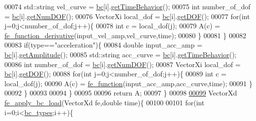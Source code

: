 \begin{DoxyCode}
00074             std::string vel\_curve = \hyperlink{_global_variables_8h_a20bdb84bef6e8184528b6f4394cf4f7a}{bc}[i].\hyperlink{class_b_c_a3590d0a29a9261d99f21ee75340e5722}{getTimeBehavior}();
00075             \textcolor{keywordtype}{int} number\_of\_dof = \hyperlink{_global_variables_8h_a20bdb84bef6e8184528b6f4394cf4f7a}{bc}[i].\hyperlink{class_b_c_a6e42c3db5c67435bf2616768959866e9}{getNumDOF}();
00076             VectorXi local\_dof = \hyperlink{_global_variables_8h_a20bdb84bef6e8184528b6f4394cf4f7a}{bc}[i].\hyperlink{class_b_c_a0bc8eb90956a082ada5e4daa5e32c9fc}{getDOF}();
00077             \textcolor{keywordflow}{for}(\textcolor{keywordtype}{int} j=0;j<number\_of\_dof;j++)\{
00078                 \textcolor{keywordtype}{int} c = local\_dof(j);
00079                 A(c) = \hyperlink{functions_8h_aa587b020c768e2a11948bfd939829b6e}{fe\_function\_derivative}(input\_vel\_amp,vel\_curve,time);
00080             \}
00081         \}
00082 
00083         \textcolor{keywordflow}{if}(type==\textcolor{stringliteral}{"acceleration"})\{
00084             \textcolor{keywordtype}{double} input\_acc\_amp = \hyperlink{_global_variables_8h_a20bdb84bef6e8184528b6f4394cf4f7a}{bc}[i].\hyperlink{class_b_c_ad648545e6ee046075350cd9b3c88e610}{getAmplitude}();
00085             std::string acc\_curve = \hyperlink{_global_variables_8h_a20bdb84bef6e8184528b6f4394cf4f7a}{bc}[i].\hyperlink{class_b_c_a3590d0a29a9261d99f21ee75340e5722}{getTimeBehavior}();
00086             \textcolor{keywordtype}{int} number\_of\_dof = \hyperlink{_global_variables_8h_a20bdb84bef6e8184528b6f4394cf4f7a}{bc}[i].\hyperlink{class_b_c_a6e42c3db5c67435bf2616768959866e9}{getNumDOF}();
00087             VectorXi local\_dof = \hyperlink{_global_variables_8h_a20bdb84bef6e8184528b6f4394cf4f7a}{bc}[i].\hyperlink{class_b_c_a0bc8eb90956a082ada5e4daa5e32c9fc}{getDOF}();
00088             \textcolor{keywordflow}{for}(\textcolor{keywordtype}{int} j=0;j<number\_of\_dof;j++)\{
00089                 \textcolor{keywordtype}{int} c = local\_dof(j);
00090                 A(c) = \hyperlink{functions_8h_a5ce8a3cf9dcc8b599ac40f7f3a48f196}{fe\_function}(input\_acc\_amp,acc\_curve,time);
00091             \}
00092         \}
00093 
00094     \}
00095 
00096     \textcolor{keywordflow}{return} A;
00097 \}
00098 
\hyperlink{fe__apply__bc_8cpp_aba32cc24bd74a4965c560fa62c5b213e}{00099} VectorXd \hyperlink{fe__apply__bc_8cpp_aba32cc24bd74a4965c560fa62c5b213e}{fe\_apply\_bc\_load}(VectorXd fe,\textcolor{keywordtype}{double} time)\{
00100 
00101     \textcolor{keywordflow}{for}(\textcolor{keywordtype}{int} i=0;i<\hyperlink{_global_variables_8h_aad28f3904552ac6aa1642c44f0bc04e7}{bc\_types};i++)\{

\end{DoxyCode}
